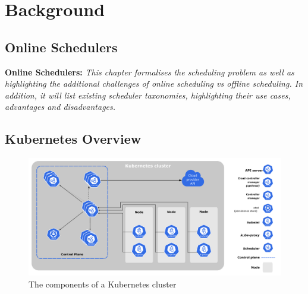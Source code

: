 \chapter{Background}

%
%

\section{Online Schedulers}
\begin{tcolorbox}[boxsep=0mm,left=2.5mm,right=2.5mm] \textbf{Online Schedulers:}
{\em This chapter formalises the scheduling problem as well as highlighting the
additional challenges of online scheduling vs offline scheduling. In addition,
it will list existing scheduler taxonomies, highlighting their use cases,
advantages and disadvantages.}  \end{tcolorbox}

\section{Kubernetes Overview}

\begin{figure}[h]
    \centering
    \includegraphics[width=\textwidth]{images/components-of-kubernetes.pdf}
    \caption{The components of a Kubernetes cluster}
    \label{kube-components}
\end{figure}

